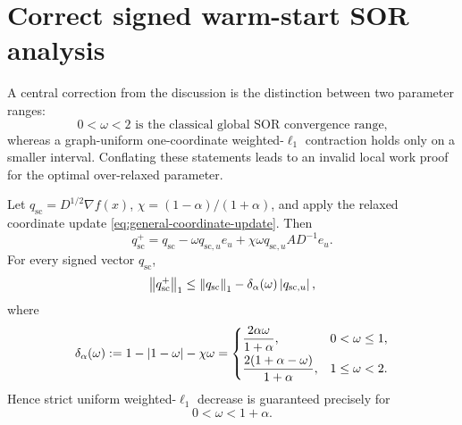 \section{Correct signed warm-start SOR analysis}
\label{sec:sor-correction}

A central correction from the discussion is the distinction between two
parameter ranges:
\begin{equation}
    \boxed{
    0<\omega<2
    \text{ is the classical global SOR convergence range,}}
    \label{eq:global-sor-range}
\end{equation}
whereas a graph-uniform one-coordinate weighted-\(\ell_1\) contraction holds
only on a smaller interval.  Conflating these statements leads to an invalid
local work proof for the optimal over-relaxed parameter.

\begin{proposition}
\label{prop:signed-sor-l1}
Let \(q_{\mathrm{sc}}=D^{1/2}\nabla f(x)\),
\(\chi=(1-\alpha)/(1+\alpha)\), and apply the relaxed coordinate update
\cref{eq:general-coordinate-update}.  Then
\begin{equation}
    q_{\mathrm{sc}}^+
    =q_{\mathrm{sc}}-\omega q_{\mathrm{sc},u} e_u
      +\chi\omega q_{\mathrm{sc},u}AD^{-1}e_u.
    \label{eq:signed-sor-scaled-update}
\end{equation}
For every signed vector \(q_{\mathrm{sc}}\),
\begin{equation}
    \left\lVert q_{\mathrm{sc}}^+\right\rVert_1
    \leq
    \left\lVert q_{\mathrm{sc}}\right\rVert_1-\delta_\alpha(\omega)\left\lvert q_{\mathrm{sc},u}\right\rvert,
    \label{eq:signed-sor-bound}
\end{equation}
where
\begin{equation}
    \delta_\alpha(\omega)
    :=1-\left\lvert 1-\omega\right\rvert-\chi\omega
    =
    \begin{cases}
      \dfrac{2\alpha\omega}{1+\alpha},
      &0<\omega\leq1,\\[2mm]
      \dfrac{2(1+\alpha-\omega)}{1+\alpha},
      &1\leq\omega<2.
    \end{cases}
    \label{eq:delta-alpha}
\end{equation}
Hence strict uniform weighted-\(\ell_1\) decrease is guaranteed precisely for
\begin{equation}
    0<\omega<1+\alpha.
    \label{eq:l1-safe-range}
\end{equation}
\end{proposition}

